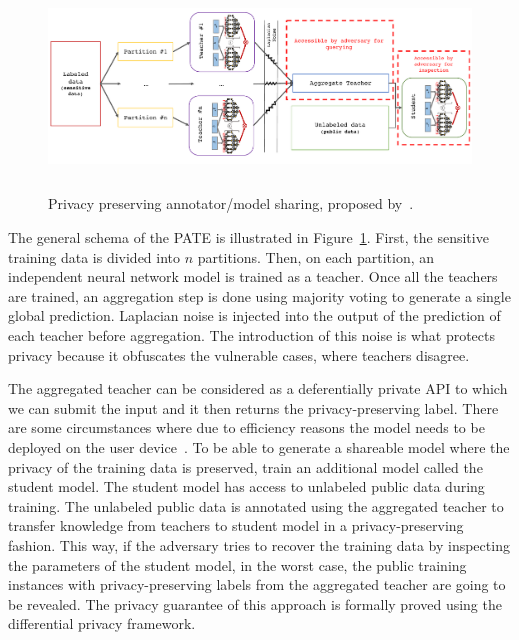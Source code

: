 \begin{figure}[t]
    \centering
    \includegraphics[height=5.5cm]{03-part-02/chapter-04/figs_and_tables/fig_privacy_preserving_ranker_model.pdf}%
    \caption{\label{fig:pp_model} Privacy preserving annotator/model sharing, proposed by~\citet{Papernot:2017}.}
\end{figure}

The general schema of the PATE is illustrated in Figure~\ref{fig:pp_model}. First, the sensitive training data is divided into $n$ partitions. Then, on each partition, an independent neural network model is trained as a teacher.  Once all the teachers are trained, an aggregation step is done using majority voting to generate a single global prediction.  
Laplacian noise is injected into the output of the prediction of each teacher before aggregation. The introduction of this noise is what protects privacy because it obfuscates the vulnerable cases, where teachers disagree. 

The aggregated teacher can be considered as a deferentially private API to which we can submit the input and it then returns the privacy-preserving label. There are some circumstances where due to efficiency reasons the model needs to be deployed on the user device~\cite{Abadi:2016}. To be able to generate a shareable model where the privacy of the training data is preserved, \citet{Papernot:2017} train an additional model called the student model. The student model has access to unlabeled public data during training. The unlabeled public data is annotated using the aggregated teacher to transfer knowledge from teachers to student model in a privacy-preserving fashion. 
This way, if the adversary tries to recover the training data by inspecting the parameters of the student model, in the worst case, the public training instances with privacy-preserving labels from the aggregated teacher are going to be revealed.  The privacy guarantee of this approach is formally proved using the differential privacy framework.

